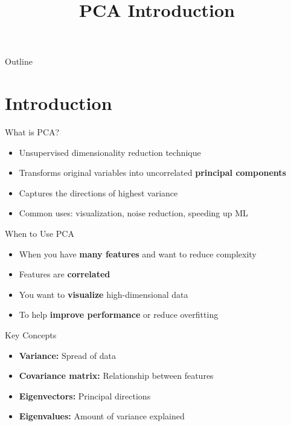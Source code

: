 \documentclass{beamer}
\title{PCA Introduction}
\subtitle{}
\date{}
\begin{document}
{
\begin{frame}
    \titlepage
\end{frame}
}

\begin{frame}{Outline}
    \tableofcontents
\end{frame}

\section{Introduction}
\begin{frame}{What is PCA?}
\begin{itemize}
    \item Unsupervised dimensionality reduction technique
    \item Transforms original variables into uncorrelated \textbf{principal components}
    \item Captures the directions of highest variance
    \item Common uses: visualization, noise reduction, speeding up ML
\end{itemize}
\end{frame}

\begin{frame}{When to Use PCA}
\begin{itemize}
    \item When you have \textbf{many features} and want to reduce complexity
    \item Features are \textbf{correlated}
    \item You want to \textbf{visualize} high-dimensional data
    \item To help \textbf{improve performance} or reduce overfitting
\end{itemize}
\end{frame}

\begin{frame}{Key Concepts}
\begin{itemize}
    \item \textbf{Variance:} Spread of data
    \item \textbf{Covariance matrix:} Relationship between features
    \item \textbf{Eigenvectors:} Principal directions
    \item \textbf{Eigenvalues:} Amount of variance explained
\end{itemize}
\end{frame}
\end{document}
